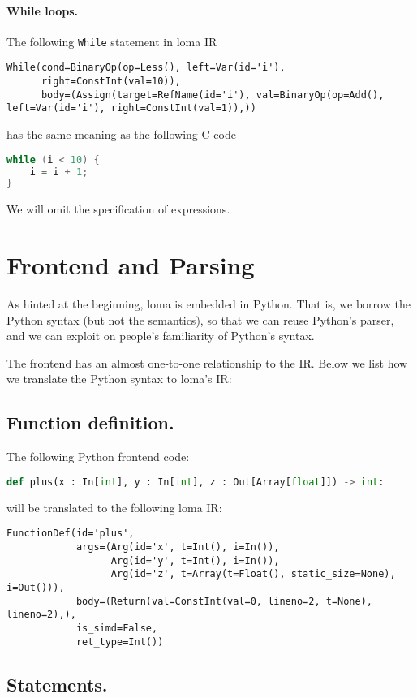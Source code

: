 \paragraph{While loops.}
The following \lstinline{While} statement in loma IR
\begin{lstlisting}
While(cond=BinaryOp(op=Less(), left=Var(id='i'),
      right=ConstInt(val=10)),
      body=(Assign(target=RefName(id='i'), val=BinaryOp(op=Add(), left=Var(id='i'), right=ConstInt(val=1)),))
\end{lstlisting}
has the same meaning as the following C code
\begin{lstlisting}[language=c]
while (i < 10) {
    i = i + 1;
}
\end{lstlisting}


We will omit the specification of expressions.

\section{Frontend and Parsing}
As hinted at the beginning, loma is embedded in Python. That is, we borrow the Python syntax (but not the semantics), so that we can reuse Python's parser, and we can exploit on people's familiarity of Python's syntax. 

The frontend has an almost one-to-one relationship to the IR. Below we list how we translate the Python syntax to loma's IR: 

\subsection{Function definition.} 
The following Python frontend code:
\begin{lstlisting}[language=Python]
def plus(x : In[int], y : In[int], z : Out[Array[float]]) -> int:
\end{lstlisting}
will be translated to the following loma IR:
\begin{lstlisting}
FunctionDef(id='plus',
            args=(Arg(id='x', t=Int(), i=In()),
                  Arg(id='y', t=Int(), i=In()),
                  Arg(id='z', t=Array(t=Float(), static_size=None), i=Out())),
            body=(Return(val=ConstInt(val=0, lineno=2, t=None), lineno=2),),
            is_simd=False,
            ret_type=Int())
\end{lstlisting}

\subsection{Statements.} 

